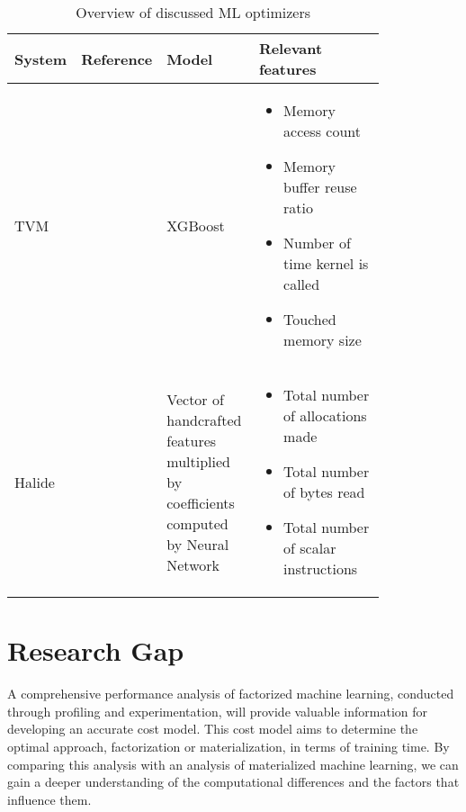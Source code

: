 \begin{table}[ht]
  \centering
  \begin{tabular}{p{0.10\linewidth}p{0.12\linewidth}p{0.25\linewidth}p{0.35\linewidth}}
    \toprule
    System & Reference                 & Model                                                                                & Relevant features                                                                                                                                                                              \\ \midrule \midrule

    TVM    & ~\cite{tvm}               & XGBoost                                                                              & \begin{itemize}[noitemsep,topsep=0pt,leftmargin=0.3cm] \item Memory access count \item Memory buffer reuse ratio \item Number of time kernel is called \item Touched memory size \end{itemize} \\ \midrule
    Halide & ~\cite{halide_cost_model} & Vector of handcrafted features multiplied by coefficients computed by Neural Network & \begin{itemize}[noitemsep,topsep=0pt,leftmargin=0.3cm] \item Total number of allocations made \item Total number of bytes read \item Total number of scalar instructions \end{itemize}         \\ \bottomrule
  \end{tabular}
  \caption{Overview of discussed ML optimizers}
  \label{tab:optimizer_overview}
\end{table}

\section{Research Gap}
A comprehensive performance analysis of factorized machine learning, conducted through profiling and experimentation, will provide valuable information for developing an accurate cost model. This cost model aims to determine the optimal approach, factorization or materialization, in terms of training time. By comparing this analysis with an analysis of materialized machine learning, we can gain a deeper understanding of the computational differences and the factors that influence them.

